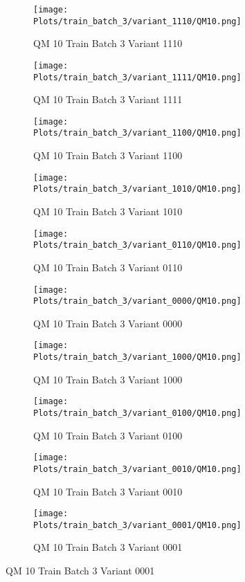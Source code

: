 \documentclass{DissertateFigs}
\begin{document}
\begin{figure}[t!]
    \begin{subfigure}{0.47\textwidth}
    \texttt{[image: Plots/train\_batch\_3/variant\_1110/QM10.png]}
    \caption{QM 10 Train Batch 3 Variant 1110}
    \end{subfigure}
    \begin{subfigure}{0.47\textwidth}
    \texttt{[image: Plots/train\_batch\_3/variant\_1111/QM10.png]}
    \caption{QM 10 Train Batch 3 Variant 1111}
    \end{subfigure}

\medskip

    \begin{subfigure}{0.47\textwidth}
    \texttt{[image: Plots/train\_batch\_3/variant\_1100/QM10.png]}
    \caption{QM 10 Train Batch 3 Variant 1100}
    \end{subfigure}
    \begin{subfigure}{0.47\textwidth}
    \texttt{[image: Plots/train\_batch\_3/variant\_1010/QM10.png]}
    \caption{QM 10 Train Batch 3 Variant 1010}
    \end{subfigure}

\medskip

    \begin{subfigure}{0.47\textwidth}
    \texttt{[image: Plots/train\_batch\_3/variant\_0110/QM10.png]}
    \caption{QM 10 Train Batch 3 Variant 0110}
    \end{subfigure}
    \begin{subfigure}{0.47\textwidth}
    \texttt{[image: Plots/train\_batch\_3/variant\_0000/QM10.png]}
    \caption{QM 10 Train Batch 3 Variant 0000}
    \end{subfigure}

\medskip

    \begin{subfigure}{0.47\textwidth}
    \texttt{[image: Plots/train\_batch\_3/variant\_1000/QM10.png]}
    \caption{QM 10 Train Batch 3 Variant 1000}
    \end{subfigure}
    \begin{subfigure}{0.47\textwidth}
    \texttt{[image: Plots/train\_batch\_3/variant\_0100/QM10.png]}
    \caption{QM 10 Train Batch 3 Variant 0100}
    \end{subfigure}

\medskip

    \begin{subfigure}{0.47\textwidth}
    \texttt{[image: Plots/train\_batch\_3/variant\_0010/QM10.png]}
    \caption{QM 10 Train Batch 3 Variant 0010}
    \end{subfigure}
    \begin{subfigure}{0.47\textwidth}
    \texttt{[image: Plots/train\_batch\_3/variant\_0001/QM10.png]}
    \caption{QM 10 Train Batch 3 Variant 0001}
    \end{subfigure}


\end{figure}
\end{document}

